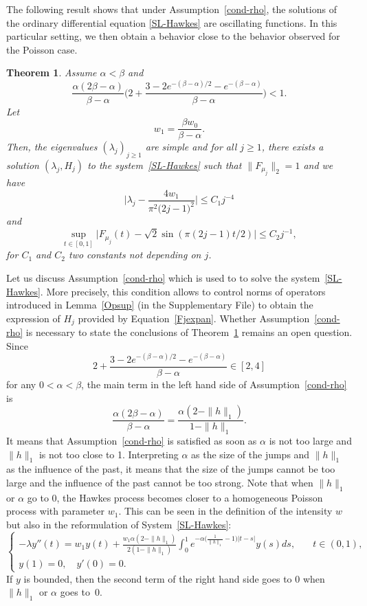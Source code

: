 \documentclass[aos]{imsart}
\theoremstyle{plain}
\newtheorem{theorem}{Theorem}[section]
\theoremstyle{remark}
\newcommand{\1}{1}
\begin{document}
The following result shows that under Assumption~\eqref{cond-rho}, the solutions of the ordinary differential equation \eqref{SL-Hawkes} are oscillating functions. In this particular setting, we then obtain a behavior close to the behavior observed for the Poisson case. 
\begin{theorem}\label{Hawkes-ed-sol}
Assume $\alpha<\beta$ and
\begin{equation}\label{cond-rho}
\frac{\alpha(2\beta-\alpha)}{\beta-\alpha}\Big(2+\frac{3-2e^{-(\beta-\alpha)/2}-e^{-(\beta-\alpha)}}{\beta-\alpha}\Big)<1.
\end{equation}
Let \[w_1=\frac{\beta w_0}{\beta-\alpha}.\] 
Then, the eigenvalues $(\lambda_j)_{j\geq 1} $ are simple and for all $j\geq 1$, there exists a solution $(\lambda_j,H_j)$ to the system~\eqref{SL-Hawkes} such that $\|F_{\mu_j}\|_2=1$ and we have
\begin{equation}\label{lambdaj}
\Bigg|\lambda_j-\frac{4w_1}{\pi^2\big(2j-1\big)^2}\Bigg|\leq C_1j^{-4}
\end{equation}
and
\begin{equation}\label{etaj}
\sup_{t\in[0,1]}\big|F_{\mu_j}(t)- \sqrt{2}\sin(\pi(2j-1)t/2)\big|\leq C_2j^{-1},
\end{equation}
for $C_1$ and $C_2$ two constants not depending on $j$. 
\end{theorem}
Let us discuss Assumption~\eqref{cond-rho} which is used to to solve the system~\eqref{SL-Hawkes}. More precisely, this condition allows to control norms of operators introduced in Lemma~\ref{Opsup} (in the Supplementary File) to obtain the expression of $H_j$ provided by Equation~\eqref{Fjexpan}. Whether Assumption~\eqref{cond-rho} is necessary to state the conclusions of Theorem~\ref{Hawkes-ed-sol} remains an open question. Since $$2+\frac{3-2e^{-(\beta-\alpha)/2}-e^{-(\beta-\alpha)}}{\beta-\alpha}\in [2,4]$$ for any $0<\alpha<\beta$, the main term in the left hand side of Assumption~\eqref{cond-rho} is $$\frac{\alpha(2\beta-\alpha)}{\beta-\alpha}=\frac{\alpha(2-\|h\|_1)}{1-\|h\|_1}.$$ It means that Assumption~\eqref{cond-rho} is satisfied as soon as $\alpha$ is not too large and $\|h\|_1$ is not too close to 1. Interpreting $\alpha$ as the size of the jumps and $\|h\|_1$ as the influence of the past, it means that the size of the jumps cannot be too large and the influence of the past cannot be too strong. Note that when $\|h\|_1$ or  $\alpha$ go to 0, the Hawkes process becomes closer to a homogeneous Poisson process with parameter $w_1$. This can be seen in the definition of the intensity $w$ but also 
in the reformulation of System~\eqref{SL-Hawkes}:
$$
\left\{
\begin{array}{ll}
\displaystyle -\lambda y''(t)=w_1 y(t)+\frac{w_1\alpha(2-\|h\|_1)}{2(1-\|h\|_1)}\int_0^1e^{-\alpha\big(\frac{1}{\|h\|_1}-1\big)|t-s|}y(s)ds,   &\quad t\in(0,1),\\
y(1)  =0,\quad y'(0)=0.&
\end{array}
\right.
$$
If $y$ is bounded, then the second term of the right hand side goes to 0 when $\|h\|_1$ or  $\alpha$ goes to~0.
\end{document}
